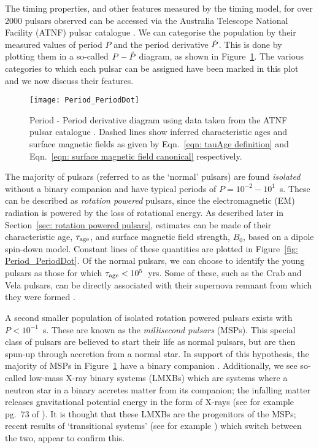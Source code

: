 The timing properties, and other features measured by the timing model, for
over 2000 pulsars observed can be accessed via the Australia Telescope National
Facility (ATNF) pulsar catalogue \citep{ATNF}.  We can categorise the
population by their measured values of period $P$ and the period derivative
$\dot{P}$. This is done by plotting them in a so-called $P - \dot{P}$ diagram, as
shown in Figure~\ref{fig: Period_PeriodDot}.  The various categories to which
each pulsar can be assigned have been marked in this plot and we now discuss
their features.

\begin{figure}[htb]
\centering
\texttt{[image: Period\_PeriodDot]} 
\caption{Period -
Period derivative diagram using data taken from the ATNF pulsar catalogue
\citep{ATNF}. Dashed lines show inferred characteristic ages and 
surface magnetic fields as given by Eqn.~\eqref{eqn: tauAge definition}
and Eqn.~\eqref{eqn: surface magnetic field canonical} respectively.}
\label{fig: Period_PeriodDot}
\end{figure}

The majority of pulsars (referred to as the `normal' pulsars) are found
\emph{isolated} without a binary companion and have typical periods of
$P=10^{-2}-10^{1}$~s. These can be described as \emph{rotation powered}
pulsars, since the electromagnetic (EM) radiation is powered by the loss of
rotational energy. As described later in Section~\ref{sec: rotation powered
pulsars}, estimates can be made of their characteristic age, $\tau_{\mathrm{age}}$, and
surface magnetic field strength, $B_{0}$, based on a dipole spin-down model.
Constant lines of these quantities are plotted in Figure~\ref{fig:
Period_PeriodDot}. Of the normal pulsars, we can choose to identify the young
pulsars as those for which $\tau_{\mathrm{age}}<10^{5}$~yrs. Some of these, such as the
Crab and Vela pulsars, can be directly associated with their supernova remnant
from which they were formed \citep{Kaspi1996}.

A second smaller population of isolated rotation powered pulsars exists with
$P<10^{-1}$~s. These are known as the \emph{millisecond pulsars} (MSPs). This
special class of pulsars are believed to start their life as normal pulsars,
but are then spun-up through accretion from a normal star. In support of this
hypothesis, the majority of MSPs in Figure~\ref{fig: Period_PeriodDot} have a
binary companion \citep{wijnands1998millisecond}. Additionally, we see so-called
low-mass X-ray binary systems (LMXBs) which are systems where a neutron star in
a binary accretes matter from its companion; the infalling matter releases
gravitational potential energy in the form of X-rays (see for example
pg.~73 of \citet{lewin1997x}). It is
thought that these LMXBs are the progenitors of the MSPs; recent results of
`transitional systems' (see for example \citep{archibald2009radio}) which
switch between the two, appear to confirm this.

